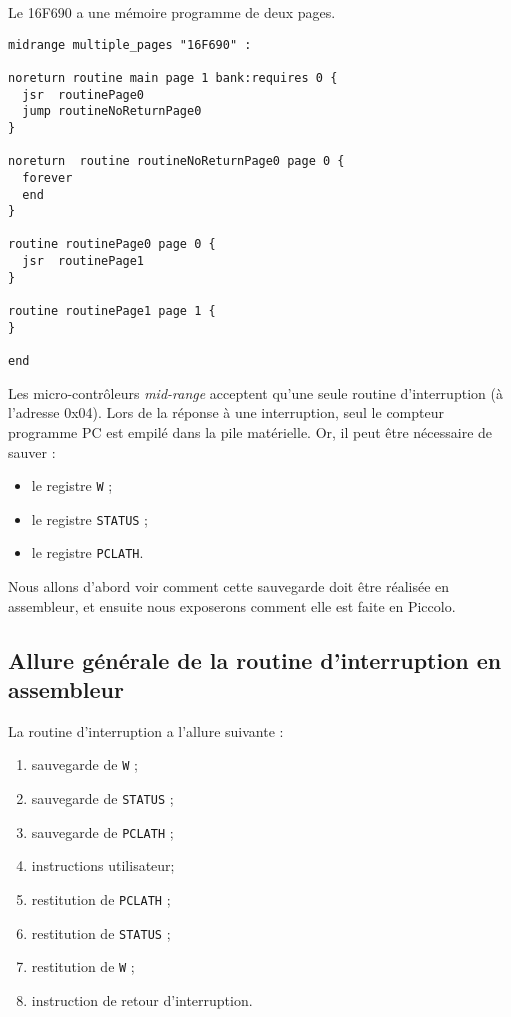 Le 16F690 a une mémoire programme de deux pages. 

\begin{lstlisting}[language=piccolo]
midrange multiple_pages "16F690" :

noreturn routine main page 1 bank:requires 0 {
  jsr  routinePage0
  jump routineNoReturnPage0
}

noreturn  routine routineNoReturnPage0 page 0 {
  forever
  end
}

routine routinePage0 page 0 {
  jsr  routinePage1
}

routine routinePage1 page 1 {
}

end
\end{lstlisting}














Les micro-contrôleurs \emph{mid-range} acceptent qu’une seule routine d’interruption (à l’adresse 0x04). Lors de la réponse à une interruption, seul le compteur programme PC est empilé dans la pile matérielle. Or, il peut être nécessaire de sauver :
\begin{itemize}
  \item le registre \texttt{W} ;
  \item le registre \texttt{STATUS} ;
  \item le registre \texttt{PCLATH}.
\end{itemize}

Nous allons d'abord voir comment cette sauvegarde doit être réalisée en assembleur, et ensuite nous exposerons comment elle est faite en Piccolo.

\subsection{Allure générale de la routine d'interruption en assembleur}

La routine d'interruption a l'allure suivante :
\begin{enumerate}
  \item sauvegarde de \texttt{W} ;
  \item sauvegarde de \texttt{STATUS} ;
  \item sauvegarde de \texttt{PCLATH} ;
  \item instructions utilisateur;
  \item restitution de \texttt{PCLATH} ;
  \item restitution de \texttt{STATUS} ;
  \item restitution de \texttt{W} ;
  \item instruction de retour d'interruption.
\end{enumerate}


